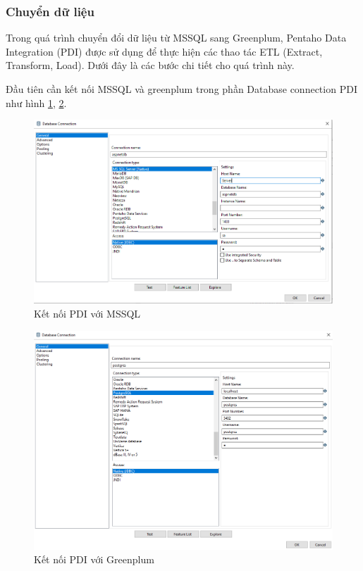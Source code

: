 \documentclass[14pt]{article}
\begin{document}
\subsubsection{Chuyển dữ liệu}

Trong quá trình chuyển đổi dữ liệu từ MSSQL sang Greenplum, Pentaho Data Integration (PDI) được sử dụng để thực hiện các thao tác ETL (Extract, Transform, Load). Dưới đây là các bước chi tiết cho quá trình này.

Đầu tiên cần kết nối MSSQL và greenplum trong phần Database connection PDI như hình \ref{fig:ConMSSQL}, \ref{fig:ConGreenplum}.


\begin{figure}
    \centering
    \includegraphics[width=0.8\linewidth]{images/ConMSSQL.png}
    \caption{Kết nối PDI với MSSQL}
    \label{fig:ConMSSQL}
\end{figure}


\begin{figure}
    \centering
    \includegraphics[width=0.8\linewidth]{images/ConGreenplum.png}
    \caption{Kết nối PDI với Greenplum}
    \label{fig:ConGreenplum}
\end{figure}
\end{document}

